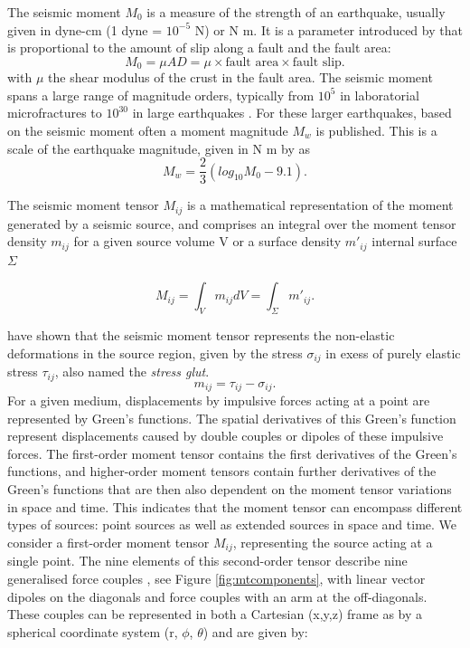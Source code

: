 \documentclass[../Text/00main.tex]{subfiles}
\begin{document}
The seismic moment $M_0$ is a measure of the strength of an earthquake, usually given in dyne-cm (1 dyne = $10^{-5}$ N) or N m. It is a parameter introduced by \citet{aki1966generation} that is proportional to the amount of slip along a fault and the fault area:
\begin{equation}
    M_0 = \mu AD = \mu \times \text{fault area} \times \text{fault slip}.
    \label{eq:momentfault}
\end{equation}
with $\mu$ the shear modulus of the crust in the fault area. The seismic moment spans a large range of magnitude orders, typically from $10^5$ in laboratorial microfractures to $10^{30}$ in large earthquakes \citep{aki_quantitative_2002}. For these larger earthquakes, based on the seismic moment often a moment magnitude $M_w$ is published. This is a scale of the earthquake magnitude, given in N m by \citet{hanks1979moment} as
\begin{equation}
    M_w = \frac{2}{3}(log_{10} M_0 - 9.1).
\end{equation} 



The seismic moment tensor $M_{ij}$ is a mathematical representation of the moment generated by a seismic source, and comprises an integral over the moment tensor density $m_{ij}$ for a given source volume $\text{V}$ or a surface density $m'_{ij}$ internal surface $\Sigma$

\begin{equation}
    M_{ij} = \int_{V} m_{ij} dV = \int_{\Sigma} m'_{ij}.
\end{equation}

\citep{backus_moment_1976} have shown that the seismic moment tensor represents the non-elastic deformations in the source region, given by the stress $\sigma_{ij}$ in exess of purely elastic stress $\tau_{ij}$, also named the \textit{stress glut}. 
\begin{equation}
    m_{ij} = \tau_{ij} - \sigma_{ij}.
\end{equation}
For a given medium, displacements by impulsive forces acting at a point are represented by Green's functions. The spatial derivatives of this Green's function represent displacements caused by double couples or dipoles of these impulsive forces. The first-order moment tensor contains the first derivatives of the Green's functions, and higher-order moment tensors contain further derivatives of the Green's functions that are then also dependent on the moment tensor variations in space and time. This indicates that the moment tensor can encompass different types of sources: point sources as well as extended sources in space and time. We consider a first-order moment tensor $M_{ij}$, representing the source acting at a single point. The nine elements of this second-order tensor describe nine generalised force couples \citep{richards1980quantitative}, see Figure \ref{fig:mtcomponents}, with linear vector dipoles on the diagonals and force couples with an arm at the off-diagonals. These couples can be represented in both a Cartesian (x,y,z) frame as by a spherical coordinate system (r, $\phi$, $\theta$) and are given by:
\end{document}
